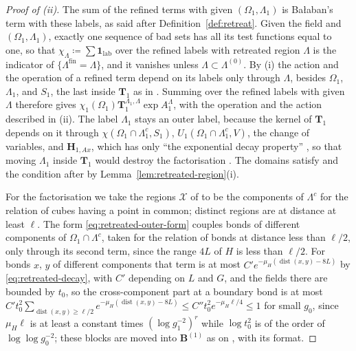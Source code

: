 \documentclass[11pt]{preprint}
\newcommand{\id}{\mathbf 1}
\newcommand{\dist}{\operatorname{dist}}
\numberwithin{equation}{section}
\theoremstyle{definition}
\theoremstyle{remark}
\theoremstyle{plain}
\begin{document}
\begin{proof}[Proof of (ii)]
The sum of the refined terms with given $(\Omega_1, \Lambda_1)$ is Ba{\l}aban's term with these labels, as said after Definition~\ref{def:retreat}. Given the field and $(\Omega_1, \Lambda_1)$, exactly one sequence of bad sets has all its test functions equal to one, so that $\chi_\Lambda \coloneqq \sum\id_{\mathrm{lab}}$ over the refined labels with retreated region $\Lambda$ is the indicator of $\{ \Lambda^{\mathrm{fin}} = \Lambda \}$, and it vanishes unless $\Lambda \subset \Lambda^{(0)}$. By (i) the action and the operation of a refined term depend on its labels only through $\Lambda$, besides $\Omega_1$, $\Lambda_1$, and $S_1$, the last inside $\mathbf T_1$ as in \cite[(1.29)]{BalabanCRE}. Summing over the refined labels with given $\Lambda$ therefore gives $\chi_1(\Omega_1)\mathbf T_1^{\Lambda_1, \Lambda}\exp A_1^\Lambda$, with the operation and the action described in (ii). The label $\Lambda_1$ stays an outer label, because the kernel of $\mathbf T_1$ depends on it through $\chi(\Omega_1 \cap \Lambda_1^c, S_1)$, $U_1(\Omega_1 \cap \Lambda_1^c, V)$, the change of variables, and $\mathbf H_{1,Ax}$, which has only ``the exponential decay property'' \cite[p.~251]{BalabanCRE}, so that moving $\Lambda_1$ inside $\mathbf T_1$ would destroy the factorisation \cite[(2.19)]{BalabanCRE}. The domains satisfy \cite[(2.1)]{BalabanCRE} and the condition after \cite[(2.3)]{BalabanCRE} by Lemma~\ref{lem:retreated-region}(i).

For the factorisation we take the regions $\mathcal X$ of \cite[(2.19)]{BalabanCRE} to be the components of $\Lambda^c$ for the relation of cubes having a point in common; distinct regions are at distance at least $\ell$. The form \eqref{eq:retreated-outer-form} couples bonds of different components of $\Omega_1 \cap \Lambda^c$, taken for the relation of bonds at distance less than $\ell/2$, only through its second term, since the range $4L$ of $H$ is less than $\ell/2$. For bonds $x$, $y$ of different components that term is at most $C'e^{-\mu_H(\dist(x, y) - 8L)}$ by \eqref{eq:retreated-decay}, with $C'$ depending on $L$ and $G$, and the fields there are bounded by $t_0$, so the cross-component part at a boundary bond is at most $C't_0^2\sum_{\dist(x, y) \geq \ell/2}e^{-\mu_H(\dist(x, y) - 8L)} \leq C''t_0^2e^{-\mu_H\ell/4} \leq 1$ for small $g_0$, since $\mu_H\ell$ is at least a constant times $(\log g_1^{-2})^r$ while $\log t_0^2$ is of the order of $\log\log g_0^{-2}$; these blocks are moved into $\mathbf B^{(1)}$ as on \cite[p.~258]{BalabanCRE}, with its format.


\end{proof}
\end{document}
